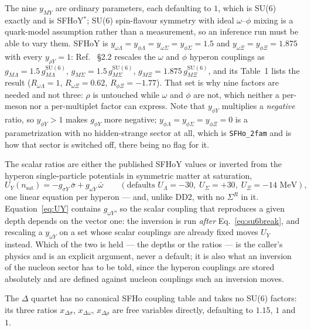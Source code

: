 \documentclass[aps,prc,onecolumn,superscriptaddress,nofootinbib,10pt]{revtex4-2}
\newcommand{\nsat}{n_{\mathrm{sat}}}
\begin{document}
The nine $y_{M Y}$ are ordinary parameters, each defaulting to $1$, which is
SU(6) exactly and is SFHoY$^*$; SU(6) spin-flavour symmetry with ideal
$\omega$--$\phi$ mixing is a quark-model assumption rather than a measurement,
so an inference run must be able to vary them. SFHoY is
$y_{\omega\Lambda} = y_{\phi\Lambda} = y_{\omega\Sigma} = y_{\phi\Sigma}
 = 1.5$ and $y_{\omega\Xi} = y_{\phi\Xi} = 1.875$ with every $y_{\rho Y} = 1$:
Ref.~\cite{Fortin2017} \S2.2 rescales the $\omega$ and $\phi$ hyperon
couplings as $g_{M\Lambda} = 1.5\, g_{M\Lambda}^{\mathrm{SU(6)}}$,
$g_{M\Sigma} = 1.5\, g_{M\Sigma}^{\mathrm{SU(6)}}$,
$g_{M\Xi} = 1.875\, g_{M\Xi}^{\mathrm{SU(6)}}$, and its Table~1 lists the
result ($R_{\omega\Lambda} = 1$, $R_{\omega\Xi} = 0.62$,
$R_{\phi\Xi} = -1.77$). That set is why nine factors are needed and not three:
$\rho$ is untouched while $\omega$ and $\phi$ are not, which neither a
per-meson nor a per-multiplet factor can express. Note that $y_{\phi Y}$
multiplies a \emph{negative} ratio, so $y_{\phi Y} > 1$ makes $g_{\phi Y}$
more negative; $y_{\phi\Lambda} = y_{\phi\Sigma} = y_{\phi\Xi} = 0$ is a
parametrization with no hidden-strange sector at all, which is
\texttt{SFHo\_2fam} and is how that sector is switched off, there being no
flag for it.

The scalar ratios are either the published SFHoY values or inverted from the
hyperon single-particle potentials in symmetric matter at saturation,
%
\begin{equation}
U_Y(\nsat) = -g_{\sigma Y}\, \bar\sigma + g_{\omega Y}\, \bar\omega
\qquad (\text{defaults } U_\Lambda = -30,\; U_\Sigma = +30,\;
        U_\Xi = -14 \text{ MeV}),
\label{eq:UY}
\end{equation}
%
one linear equation per hyperon --- and, unlike DD2, with no $\Sigma^R$ in it.
Equation~\eqref{eq:UY} contains $g_{\omega Y}$, so the scalar coupling that
reproduces a given depth depends on the vector one: the inversion is run
\emph{after} Eq.~\eqref{eq:su6break}, and rescaling a $y_{\omega Y}$ on a set
whose scalar couplings are already fixed moves $U_Y$ instead. Which of the two
is held --- the depths or the ratios --- is the caller's physics and is an
explicit argument, never a default; it is also what an inversion of the
nucleon sector has to be told, since the hyperon couplings are stored
absolutely and are defined against nucleon couplings such an inversion moves.

The $\Delta$ quartet has no canonical SFHo coupling table and takes no SU(6)
factors: its three ratios $x_{\Delta\sigma}$, $x_{\Delta\omega}$,
$x_{\Delta\rho}$ are free variables directly, defaulting to $1.15$, $1$ and
$1$.
\end{document}
